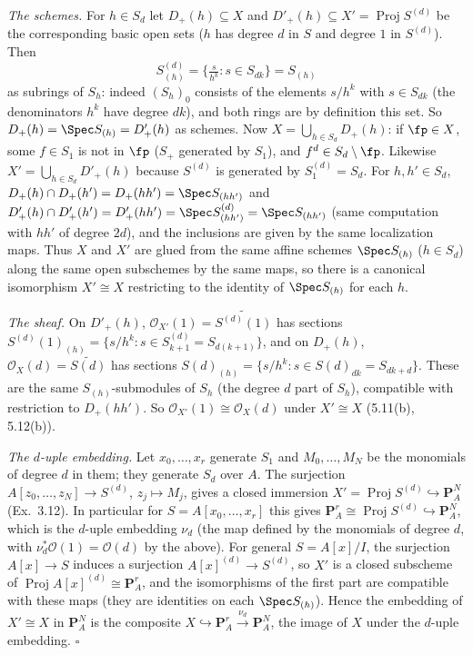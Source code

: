 \documentclass[11pt]{article}
\begin{document}
\emph{The schemes.} For $h\in S_d$ let $D_+(h)\subseteq X$ and $D'_+(h)\subseteq X'=\operatorname{Proj}S^{(d)}$ be the corresponding basic open sets ($h$ has degree $d$ in $S$ and degree $1$ in $S^{(d)}$). Then
\[
S^{(d)}_{(h)}=\Big\{\tfrac s{h^k}:s\in S_{dk}\Big\}=S_{(h)}
\]
as subrings of $S_h$: indeed $(S_h)_0$ consists of the elements $s/h^k$ with $s\in S_{dk}$ (the denominators $h^k$ have degree $dk$), and both rings are by definition this set. So $D_+(h)=\Spec S_{(h)}=D'_+(h)$ as schemes. Now $X=\bigcup_{h\in S_d}D_+(h)$: if $\fp\in X$, some $f\in S_1$ is not in $\fp$ ($S_+$ generated by $S_1$), and $f^d\in S_d\setminus\fp$. Likewise $X'=\bigcup_{h\in S_d}D'_+(h)$ because $S^{(d)}$ is generated by $S^{(d)}_1=S_d$. For $h,h'\in S_d$, $D_+(h)\cap D_+(h')=D_+(hh')=\Spec S_{(hh')}$ and $D'_+(h)\cap D'_+(h')=D'_+(hh')=\Spec S^{(d)}_{(hh')}=\Spec S_{(hh')}$ (same computation with $hh'$ of degree $2d$), and the inclusions are given by the same localization maps. Thus $X$ and $X'$ are glued from the same affine schemes $\Spec S_{(h)}$ ($h\in S_d$) along the same open subschemes by the same maps, so there is a canonical isomorphism $X'\cong X$ restricting to the identity of $\Spec S_{(h)}$ for each $h$.

\emph{The sheaf.} On $D'_+(h)$, $\mathcal O_{X'}(1)=\widetilde{S^{(d)}(1)}$ has sections $S^{(d)}(1)_{(h)}=\{s/h^k:s\in S^{(d)}_{k+1}=S_{d(k+1)}\}$, and on $D_+(h)$, $\mathcal O_X(d)=\widetilde{S(d)}$ has sections $S(d)_{(h)}=\{s/h^k: s\in S(d)_{dk}=S_{dk+d}\}$. These are the same $S_{(h)}$-submodules of $S_h$ (the degree $d$ part of $S_h$), compatible with restriction to $D_+(hh')$. So $\mathcal O_{X'}(1)\cong\mathcal O_X(d)$ under $X'\cong X$ (5.11(b), 5.12(b)).

\emph{The $d$-uple embedding.} Let $x_0,\dots,x_r$ generate $S_1$ and $M_0,\dots,M_N$ be the monomials of degree $d$ in them; they generate $S_d$ over $A$. The surjection $A[z_0,\dots,z_N]\to S^{(d)}$, $z_j\mapsto M_j$, gives a closed immersion $X'=\operatorname{Proj}S^{(d)}\hookrightarrow\mathbf P^N_A$ (Ex.\ 3.12). In particular for $S=A[x_0,\dots,x_r]$ this gives $\mathbf P^r_A\cong\operatorname{Proj}S^{(d)}\hookrightarrow\mathbf P^N_A$, which is the $d$-uple embedding $\nu_d$ (the map defined by the monomials of degree $d$, with $\nu_d^*\mathcal O(1)=\mathcal O(d)$ by the above). For general $S=A[x]/I$, the surjection $A[x]\to S$ induces a surjection $A[x]^{(d)}\to S^{(d)}$, so $X'$ is a closed subscheme of $\operatorname{Proj}A[x]^{(d)}\cong\mathbf P^r_A$, and the isomorphisms of the first part are compatible with these maps (they are identities on each $\Spec S_{(h)}$). Hence the embedding of $X'\cong X$ in $\mathbf P^N_A$ is the composite $X\hookrightarrow\mathbf P^r_A\xrightarrow{\nu_d}\mathbf P^N_A$, the image of $X$ under the $d$-uple embedding. \hfill$\square$
\end{document}
